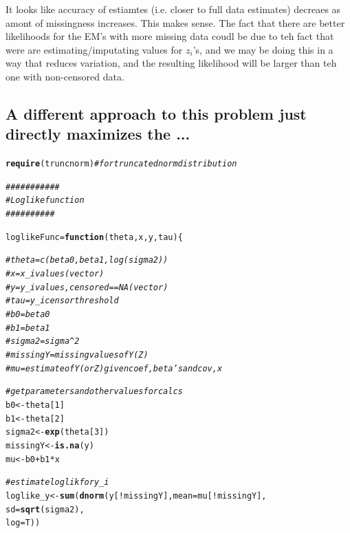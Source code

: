 \documentclass{article}\usepackage[]{graphicx}\usepackage[]{color}
\makeatletter
\newcommand{\hlnum}[1]{\textcolor[rgb]{0.686,0.059,0.569}{#1}}%
\newcommand{\hlcom}[1]{\textcolor[rgb]{0.678,0.584,0.686}{\textit{#1}}}%
\newcommand{\hlopt}[1]{\textcolor[rgb]{0,0,0}{#1}}%
\newcommand{\hlstd}[1]{\textcolor[rgb]{0.345,0.345,0.345}{#1}}%
\newcommand{\hlkwa}[1]{\textcolor[rgb]{0.161,0.373,0.58}{\textbf{#1}}}%
\newcommand{\hlkwb}[1]{\textcolor[rgb]{0.69,0.353,0.396}{#1}}%
\newcommand{\hlkwc}[1]{\textcolor[rgb]{0.333,0.667,0.333}{#1}}%
\newcommand{\hlkwd}[1]{\textcolor[rgb]{0.737,0.353,0.396}{\textbf{#1}}}%
\newenvironment{kframe}{%
 \def\at@end@of@kframe{}%
 \ifinner\ifhmode%
  \def\at@end@of@kframe{\end{minipage}}%
  \begin{minipage}{\columnwidth}%
 \fi\fi%
 \def\FrameCommand##1{\hskip\@totalleftmargin \hskip-\fboxsep
 \colorbox{shadecolor}{##1}\hskip-\fboxsep
     \hskip-\linewidth \hskip-\@totalleftmargin \hskip\columnwidth}%
 \MakeFramed {\advance\hsize-\width
   \@totalleftmargin\z@ \linewidth\hsize
   \@setminipage}}%
 {\par\unskip\endMakeFramed%
 \at@end@of@kframe}
\newenvironment{knitrout}{}{} %
\makeatother
\begin{document}
It looks like accuracy of estiamtes (i.e. closer to full data estimates) decreaes as amont of missingness increases. This makes sense. The fact that there are better likelihoods for the EM's with more missing data coudl be due to teh fact that were are estimating/imputating values for $z_i$'s, and we may be doing this in a way that reduces variation, and the resulting likelihood will be larger than teh one with non-censored data.


\subsection{A different approach to this problem just directly maximizes the ...}

\begin{knitrout}
\color{fgcolor}\begin{kframe}
\begin{alltt}
\hlkwd{require}\hlstd{(truncnorm)} \hlcom{#for truncated norm distribution}

\hlcom{###########}
\hlcom{# Loglike function}
\hlcom{##########}

\hlstd{loglikeFunc} \hlkwb{=} \hlkwa{function}\hlstd{(}\hlkwc{theta}\hlstd{,} \hlkwc{x}\hlstd{,} \hlkwc{y}\hlstd{,} \hlkwc{tau}\hlstd{) \{}

    \hlcom{#theta = c(beta0, beta1, log(sigma2))}
    \hlcom{#x = x_i values (vector)}
    \hlcom{#y = y_i values, censored==NA (vector)}
    \hlcom{#tau = y_i censor threshold}
    \hlcom{#b0 = beta0}
    \hlcom{#b1 = beta1}
    \hlcom{#sigma2 = sigma^2}
    \hlcom{#missingY = missing values of Y (Z)}
    \hlcom{#mu = estimate of Y (or Z) given coef, beta's and cov, x}

    \hlcom{#get parameters and other values for calcs}
    \hlstd{b0} \hlkwb{<-} \hlstd{theta[}\hlnum{1}\hlstd{]}
    \hlstd{b1} \hlkwb{<-} \hlstd{theta[}\hlnum{2}\hlstd{]}
    \hlstd{sigma2} \hlkwb{<-} \hlkwd{exp}\hlstd{(theta[}\hlnum{3}\hlstd{])}
    \hlstd{missingY} \hlkwb{<-} \hlkwd{is.na}\hlstd{(y)}
    \hlstd{mu} \hlkwb{<-} \hlstd{b0} \hlopt{+} \hlstd{b1} \hlopt{*} \hlstd{x}

    \hlcom{#estimate loglik for y_i}
    \hlstd{loglike_y} \hlkwb{<-} \hlkwd{sum}\hlstd{(}\hlkwd{dnorm}\hlstd{(y[}\hlopt{!}\hlstd{missingY],} \hlkwc{mean} \hlstd{= mu[}\hlopt{!}\hlstd{missingY],}
                          \hlkwc{sd} \hlstd{=} \hlkwd{sqrt}\hlstd{(sigma2),}
                          \hlkwc{log} \hlstd{= T))}


\end{alltt}
\end{kframe}
\end{knitrout}
\end{document}
